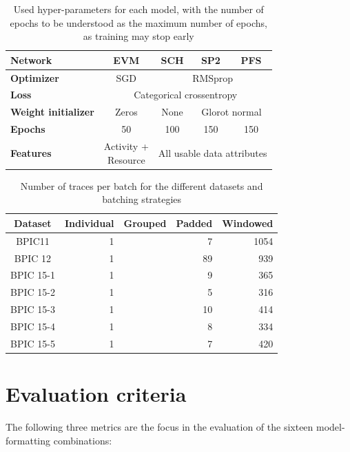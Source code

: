 \begin{table}[ht!]
    \centering
    \begin{tabular}{lcccc}
        \textbf{Network}   & \textbf{EVM} & \textbf{SCH} & \textbf{SP2} & \textbf{PFS}\\
        \hline
        \textbf{Optimizer} & SGD & \multicolumn{3}{c}{RMSprop} \\
        \textbf{Loss}      &\multicolumn{4}{c}{Categorical crossentropy}\\
        \textbf{Weight initializer} & Zeros & None & \multicolumn{2}{c}{Glorot normal}\\
        \textbf{Epochs}    & 50 & 100 & 150 & 150\\
        \textbf{Features}  & \makecell{Activity +\\Resource} & \multicolumn{3}{c}{All usable data attributes}\\
    \end{tabular}
    \caption[Used hyper-parameters for each model]{Used hyper-parameters for each model, with the number of epochs to be understood as the maximum number of epochs, as training may stop early}
    \label{tab:training-setup}
\end{table}


\begin{table}
\centering
\begin{tabular}{c|rrrr}
Dataset & Individual & Grouped & Padded & Windowed \\
\hline
BPIC11    & 1 & & 7 & 1054\\
BPIC 12   & 1 & & 89 & 939\\
BPIC 15-1 & 1 & & 9 & 365\\
BPIC 15-2 & 1 & & 5 & 316\\
BPIC 15-3 & 1 & & 10 & 414\\
BPIC 15-4 & 1 & & 8 & 334\\
BPIC 15-5 & 1 & & 7 & 420\\
\end{tabular}
\caption[Batch sizes for each dataset and strategy]{Number of traces per batch for the different datasets and batching strategies}
\label{tab:batch-sizes}
\end{table}

\section{Evaluation criteria}
\label{sec:eval:criteria}
The following three metrics are the focus in the evaluation of the sixteen model-formatting combinations:

